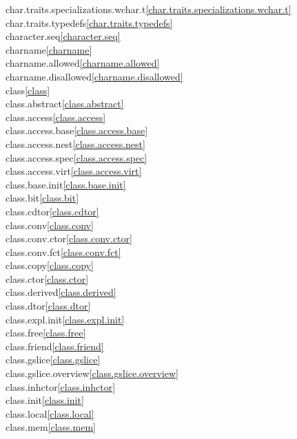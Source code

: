 \begin{multicols}{2}
char.traits.specializations.wchar.t\quad\ref{char.traits.specializations.wchar.t}\\
char.traits.typedefs\quad\ref{char.traits.typedefs}\\
character.seq\quad\ref{character.seq}\\
charname\quad\ref{charname}\\
charname.allowed\quad\ref{charname.allowed}\\
charname.disallowed\quad\ref{charname.disallowed}\\
class\quad\ref{class}\\
class.abstract\quad\ref{class.abstract}\\
class.access\quad\ref{class.access}\\
class.access.base\quad\ref{class.access.base}\\
class.access.nest\quad\ref{class.access.nest}\\
class.access.spec\quad\ref{class.access.spec}\\
class.access.virt\quad\ref{class.access.virt}\\
class.base.init\quad\ref{class.base.init}\\
class.bit\quad\ref{class.bit}\\
class.cdtor\quad\ref{class.cdtor}\\
class.conv\quad\ref{class.conv}\\
class.conv.ctor\quad\ref{class.conv.ctor}\\
class.conv.fct\quad\ref{class.conv.fct}\\
class.copy\quad\ref{class.copy}\\
class.ctor\quad\ref{class.ctor}\\
class.derived\quad\ref{class.derived}\\
class.dtor\quad\ref{class.dtor}\\
class.expl.init\quad\ref{class.expl.init}\\
class.free\quad\ref{class.free}\\
class.friend\quad\ref{class.friend}\\
class.gslice\quad\ref{class.gslice}\\
class.gslice.overview\quad\ref{class.gslice.overview}\\
class.inhctor\quad\ref{class.inhctor}\\
class.init\quad\ref{class.init}\\
class.local\quad\ref{class.local}\\
class.mem\quad\ref{class.mem}\\

\end{multicols}
